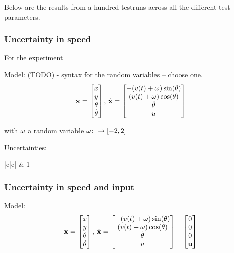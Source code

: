Below are the results from a hundred testruns across all the different test
parameters.

\subsubsection{Uncertainty in speed}

For the experiment

Model: (TODO) - syntax for the random variables -- choose one.
\begin{equation}
  \label{eq:model-dynamics}
  \mathbf{x} =
  \begin{bmatrix}
    x \\ y \\ \theta \\ \dot{\theta} \\
  \end{bmatrix}, \, \dot{\mathbf{x}} =
  \begin{bmatrix}
    -(v(t) + \mathbf{\omega}{}) \sin(\theta) \\
    (v(t) + \mathbf{\omega}{}) \cos(\theta) \\
    \dot{\theta} \\
    u \\
  \end{bmatrix}
\end{equation}

with \(\mathbf{\omega}{}\) a random variable \(\mathbf{\omega}{} \colon
\rightarrow [-2,2]\)

Uncertainties:
\begin{table}{|c|c|}
  \randomSpeedVar{} & 1 \\
\end{table}

\subsubsection{Uncertainty in speed and input}
Model:
\begin{equation}
  \label{eq:model-dynamics}
  \mathbf{x} =
  \begin{bmatrix}
    x \\ y \\ \theta \\ \dot{\theta} \\
  \end{bmatrix}, \, \dot{\mathbf{x}} =
  \begin{bmatrix}
    -(v(t) + \mathbf{\omega}{}) \sin(\theta) \\
    (v(t) + \mathbf{\omega}{}) \cos(\theta) \\
    \dot{\theta} \\
    u \\
  \end{bmatrix}
  +
  \begin{bmatrix}
    0 \\
    0 \\
    0 \\
    \mathbf{u}{} \\
  \end{bmatrix}
\end{equation}

